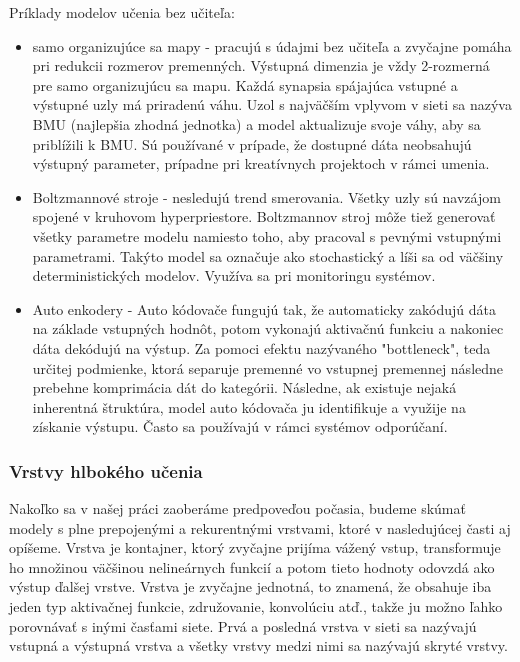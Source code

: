 Príklady modelov učenia bez učiteľa:
\begin{itemize}
  \item samo organizujúce sa mapy - pracujú s údajmi bez učiteľa a zvyčajne pomáha pri redukcii rozmerov premenných. Výstupná dimenzia je vždy 2-rozmerná pre samo organizujúcu sa mapu. Každá synapsia spájajúca vstupné a výstupné uzly má priradenú váhu. Uzol s najväčším vplyvom v sieti sa nazýva BMU (najlepšia zhodná jednotka) a model aktualizuje svoje váhy, aby sa priblížili k BMU. Sú používané v prípade, že dostupné dáta neobsahujú výstupný parameter, prípadne pri kreatívnych projektoch v rámci umenia.
  \item Boltzmannové stroje - nesledujú trend smerovania. Všetky uzly sú navzájom spojené v kruhovom hyperpriestore. Boltzmannov stroj môže tiež generovať všetky parametre modelu namiesto toho, aby pracoval s pevnými vstupnými parametrami. Takýto model sa označuje ako stochastický a líši sa od väčšiny deterministických modelov. Využíva sa pri monitoringu systémov.
  \item Auto enkodery - Auto kódovače fungujú tak, že automaticky zakódujú dáta na základe vstupných hodnôt, potom vykonajú aktivačnú funkciu a nakoniec dáta dekódujú na výstup. Za pomoci efektu nazývaného "bottleneck", teda určitej podmienke, ktorá separuje premenné vo vstupnej premennej následne prebehne komprimácia dát do kategórii. Následne, ak existuje nejaká inherentná štruktúra, model auto kódovača ju identifikuje a využije na získanie výstupu. Často sa používajú v rámci systémov odporúčaní.
\end{itemize}

\subsubsection{Vrstvy hlbokého učenia}
Nakoľko sa v našej práci zaoberáme predpoveďou počasia, budeme skúmať modely s plne prepojenými a rekurentnými vrstvami, ktoré v nasledujúcej časti aj opíšeme. Vrstva je kontajner, ktorý zvyčajne prijíma vážený vstup, transformuje ho množinou väčšinou nelineárnych funkcií a potom tieto hodnoty odovzdá ako výstup ďalšej vrstve. Vrstva je zvyčajne jednotná, to znamená, že obsahuje iba jeden typ aktivačnej funkcie, združovanie, konvolúciu atď., takže ju možno ľahko porovnávať s inými časťami siete. Prvá a posledná vrstva v sieti sa nazývajú vstupná a výstupná vrstva a všetky vrstvy medzi nimi sa nazývajú skryté vrstvy.

